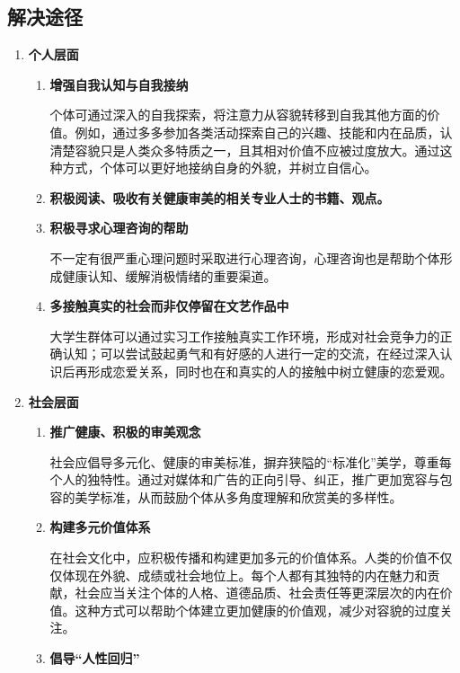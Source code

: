 \subsection{解决途径}
\begin{enumerate}[leftmargin=7em]
    \item \textbf{个人层面}
    \begin{enumerate}
        \item \textbf{增强自我认知与自我接纳}

        个体可通过深入的自我探索，将注意力从容貌转移到自我其他方面的价值。例如，通过多多参加各类活动探索自己的兴趣、技能和内在品质，认清楚容貌只是人类众多特质之一，且其相对价值不应被过度放大。通过这种方式，个体可以更好地接纳自身的外貌，并树立自信心。

        \item \textbf{积极阅读、吸收有关健康审美的相关专业人士的书籍、观点。}

        \item \textbf{积极寻求心理咨询的帮助}

        不一定有很严重心理问题时采取进行心理咨询，心理咨询也是帮助个体形成健康认知、缓解消极情绪的重要渠道。

        \item \textbf{多接触真实的社会而非仅停留在文艺作品中}

        大学生群体可以通过实习工作接触真实工作环境，形成对社会竞争力的正确认知；可以尝试鼓起勇气和有好感的人进行一定的交流，在经过深入认识后再形成恋爱关系，同时也在和真实的人的接触中树立健康的恋爱观。
    \end{enumerate}
    \item \textbf{社会层面}
    \begin{enumerate}
        \item \textbf{推广健康、积极的审美观念}

        社会应倡导多元化、健康的审美标准，摒弃狭隘的``标准化''美学，尊重每个人的独特性。通过对媒体和广告的正向引导、纠正，推广更加宽容与包容的美学标准，从而鼓励个体从多角度理解和欣赏美的多样性。

        \item \textbf{构建多元价值体系}

        在社会文化中，应积极传播和构建更加多元的价值体系。人类的价值不仅仅体现在外貌、成绩或社会地位上。每个人都有其独特的内在魅力和贡献，社会应当关注个体的人格、道德品质、社会责任等更深层次的内在价值。这种方式可以帮助个体建立更加健康的价值观，减少对容貌的过度关注。

        \item \textbf{倡导``人性回归''}


\end{enumerate}
\end{enumerate}
